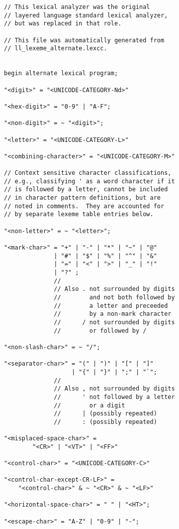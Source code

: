 \documentclass[12pt]{article}
\newenvironment{indpar}[1][0.3in]%
	{\begin{list}{}%
		     {\setlength{\itemsep}{0in}%
		      \setlength{\topsep}{0in}%
		      \setlength{\parsep}{1ex}%
		      \setlength{\labelwidth}{#1}%
		      \setlength{\leftmargin}{#1}%
		      \addtolength{\leftmargin}{\labelsep}}%
	 \item}%
	{\end{list}}
\begin{document}
\begin{indpar}
\begin{verbatim}
// This lexical analyzer was the original
// layered language standard lexical analyzer,
// but was replaced in that role.

// This file was automatically generated from
// ll_lexeme_alternate.lexcc.


begin alternate lexical program;

"<digit>" = "<UNICODE-CATEGORY-Nd>"

"<hex-digit>" = "0-9" | "A-F";

"<non-digit>" = ~ "<digit>";

"<letter>" = "<UNICODE-CATEGORY-L>"

"<combining-character>" = "<UNICODE-CATEGORY-M>"

// Context sensitive character classifications,
// e.g., classifying ' as a word character if it
// is followed by a letter, cannot be included
// in character pattern definitions, but are
// noted in comments.  They are accounted for
// by separate lexeme table entries below.

"<non-letter>" = ~ "<letter>";

"<mark-char>" = "+" | "-" | "*" | "~" | "@"
              | "#" | "$" | "%" | "^" | "&"
              | "=" | "<" | ">" | "_" | "!"
              | "?" ;
              //
              // Also . not surrounded by digits
              //        and not both followed by
              //        a letter and preceeded
              //        by a non-mark character
              //      / not surrounded by digits
              //        or followed by /

"<non-slash-char>" = ~ "/";

"<separator-char>" = "(" | ")" | "[" | "]"
                   | "{" | "}" | ";" | "`";
              //
              // Also , not surrounded by digits
              //      ' not followed by a letter
              //        or a digit
              //      | (possibly repeated)
              //      : (possibly repeated)

"<misplaced-space-char>" =
        "<CR>" | "<VT>" | "<FF>"

"<control-char>" = "<UNICODE-CATEGORY-C>"

"<control-char-except-CR-LF>" =
    "<control-char>" & ~ "<CR>" & ~ "<LF>"

"<horizontal-space-char>" = " " | "<HT>";

"<escape-char>" = "A-Z" | "0-9" | "-";



\end{verbatim}
\end{indpar}
\end{document}
